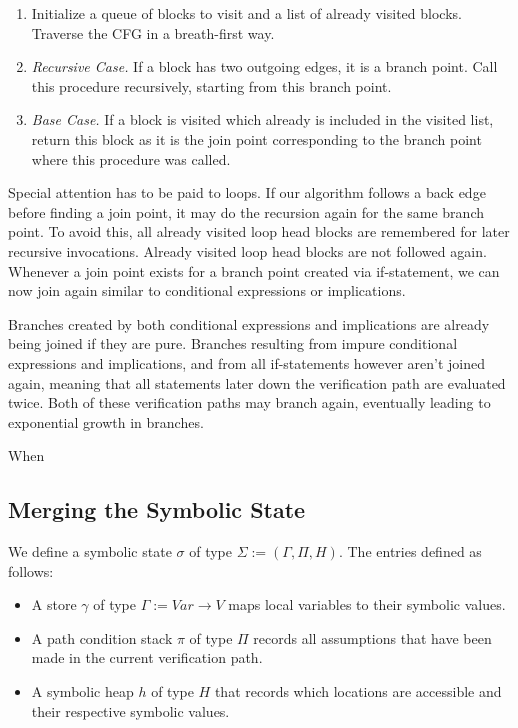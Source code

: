 \documentclass[11pt]{article}
\begin{document}
    \begin{enumerate}
        \item Initialize a queue of blocks to visit and a list of already visited blocks.
            Traverse the CFG in a breath-first way.
        \item \emph{Recursive Case.} If a block has two outgoing edges, it is a branch point.
            Call this procedure recursively, starting from this branch point.
        \item \emph{Base Case.} If a block is visited which already is included in the visited list,
            return this block as it is the join point corresponding to the branch point where this procedure was called.
    \end{enumerate}

    Special attention has to be paid to loops. If our algorithm follows a back edge before finding a join point,
    it may do the recursion again for the same branch point. To avoid this, all already visited loop head blocks
    are remembered for later recursive invocations. Already visited loop head blocks are not followed again.
    Whenever a join point exists for a branch point created via if-statement, we can now join again similar to
    conditional expressions or implications.

    Branches created by both conditional expressions and implications are already being joined if they are pure.
    Branches resulting from impure conditional expressions and implications,
    and from all if-statements however aren't joined again, meaning that
    all statements later down the verification path are evaluated twice. Both of these
    verification paths may branch again, eventually leading to exponential growth in branches.

    When 

    \subsection{Merging the Symbolic State} \label{approach:merging-the-symbolic-state}
    
    We define a symbolic state $\sigma$ of type $\Sigma := (\Gamma, \Pi, H)$. The entries
    defined as follows:

    \begin{itemize}
        \item A store $\gamma$ of type $\Gamma := Var \to V$ maps local variables to their symbolic values.
        \item A path condition stack $\pi$ of type $\Pi$ records all assumptions that have been made in the current verification path.
        \item A symbolic heap $h$ of type $H$ that records which locations are accessible and their respective symbolic values.
    \end{itemize}
\end{document}
